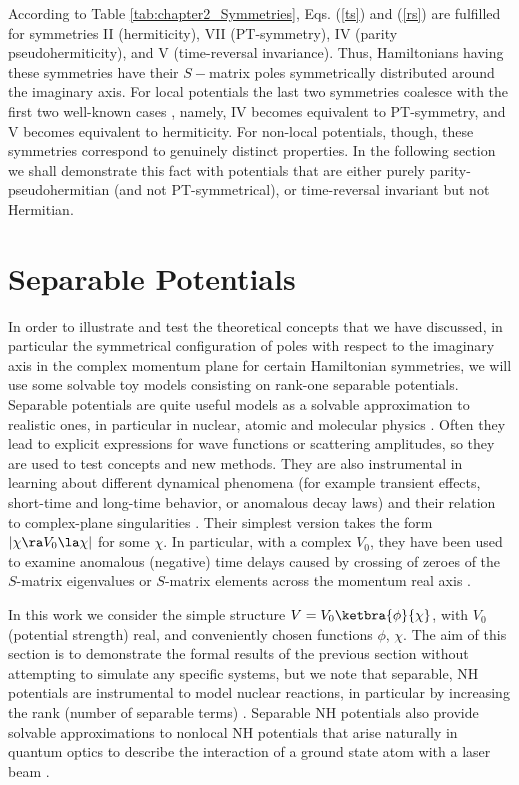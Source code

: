 According to Table \ref{tab:chapter2_Symmetries},  Eqs. (\ref{ts}) and (\ref{rs}) are fulfilled
for symmetries  II (hermiticity), VII (PT-symmetry), IV (parity pseudohermiticity),
and V (time-reversal invariance). Thus, Hamiltonians having these symmetries have their $S-$matrix poles symmetrically distributed around the imaginary axis. For local potentials the last two symmetries coalesce with the first two well-known
cases \cite{Ruschhaupt2017}, namely,
IV becomes equivalent to PT-symmetry, and V becomes equivalent to hermiticity. For non-local potentials, though, these symmetries
correspond to genuinely distinct properties. In the following section we shall demonstrate this fact with potentials that are
either purely parity-pseudohermitian (and not PT-symmetrical), or time-reversal invariant but not Hermitian.
%
\section{Separable Potentials}
\label{sec:chapter2_separablePotentials}
%
%
In order to illustrate and test the theoretical concepts that we have discussed, in particular the
symmetrical configuration of poles with respect to the imaginary axis in the complex momentum plane for certain Hamiltonian symmetries, we will use some solvable toy models consisting on rank-one separable potentials.
Separable potentials are quite useful models as a solvable approximation to realistic ones, in particular in nuclear, atomic and molecular physics \cite{Popov2019}.
Often they lead to explicit expressions
for wave functions or scattering amplitudes, so they are used to test concepts and new methods.
They are also instrumental in learning about different dynamical phenomena (for example transient effects, short-time and long-time behavior, or anomalous decay laws)  and their relation to complex-plane singularities
\cite{Muga1990,Muga1996,Muga1996a,Muga1998}. Their simplest version takes the form
$|\chi\ra V_0\la\chi|$ for some  $\chi$.   In particular, with a complex $V_0$,
they have been used to examine anomalous (negative) time delays caused by  crossing of zeroes of the $S$-matrix eigenvalues or $S$-matrix elements across the momentum real axis \cite{Muga1998a}.

In this work we consider the simple structure
$V=V_0 \ketbra{\phi}{\chi}$, with $V_0$ (potential strength) real, and conveniently chosen functions $\phi$, $\chi$.
The aim of this section is to demonstrate the formal results of the previous section without attempting to simulate any specific systems, but we note that separable, NH potentials are instrumental to model nuclear reactions, in particular  by increasing the rank (number of separable terms) \cite{Hlophe2017}.
Separable NH potentials also provide solvable approximations to nonlocal NH potentials that arise naturally in quantum optics to describe the interaction of a ground state atom with a laser beam \cite{Ruschhaupt2004a}.

